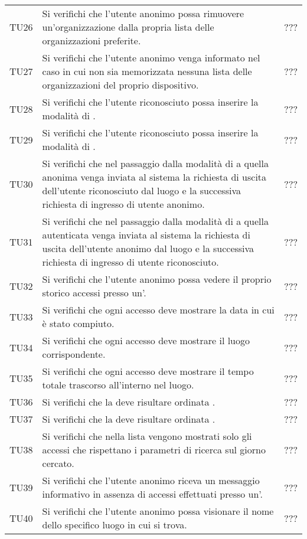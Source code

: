 {\begin{longtable}{ c C{13cm} C{1cm}}
TU26 & Si verifichi che l'utente anonimo possa rimuovere un'organizzazione dalla propria lista delle organizzazioni preferite. & ??? \\
TU27 & Si verifichi che l'utente anonimo venga informato nel caso in cui non sia memorizzata nessuna lista delle organizzazioni del proprio dispositivo. & ??? \\
TU28 & Si verifichi che l'utente riconosciuto possa inserire la modalità di . & ??? \\
TU29 & Si verifichi che l'utente riconosciuto possa inserire la modalità di . & ??? \\
TU30 & Si verifichi che nel passaggio dalla modalità di  a quella anonima venga inviata al sistema la richiesta di uscita dell'utente riconosciuto dal luogo e la successiva richiesta di ingresso di utente anonimo. & ??? \\
TU31 & Si verifichi che nel passaggio dalla modalità di  a quella autenticata venga inviata al sistema la richiesta di uscita dell'utente anonimo dal luogo e la successiva richiesta di ingresso di utente riconosciuto. & ??? \\
TU32 & Si verifichi che l'utente anonimo possa vedere il proprio storico accessi presso un'. & ??? \\
TU33 & Si verifichi che ogni accesso deve mostrare la data in cui è stato compiuto. & ??? \\
TU34 & Si verifichi che ogni accesso deve mostrare il luogo corrispondente.  & ??? \\
TU35 & Si verifichi che ogni accesso deve mostrare il tempo totale trascorso all'interno nel luogo. & ??? \\
TU36 & Si verifichi che la  deve risultare ordinata . & ??? \\
TU37 & Si verifichi che la  deve risultare ordinata . & ??? \\
TU38 & Si verifichi che nella lista vengono mostrati solo gli accessi che rispettano i parametri di ricerca sul giorno cercato. & ??? \\
TU39 & Si verifichi che l’utente anonimo riceva un messaggio informativo in assenza di accessi effettuati presso un'. & ??? \\
TU40 & Si verifichi che l’utente anonimo possa visionare il nome dello specifico luogo in cui si trova. & ??? \\

\end{longtable}}
